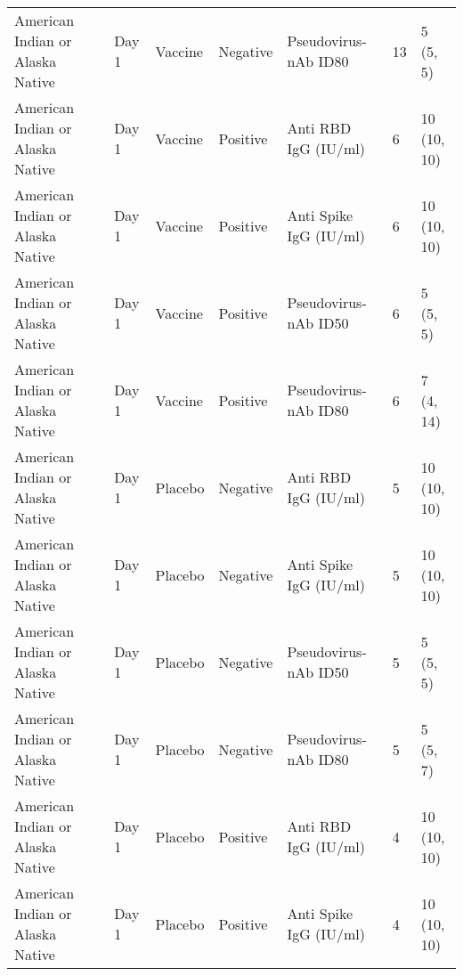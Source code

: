 \documentclass[]{book}
\theoremstyle{definition}
\theoremstyle{definition}
\theoremstyle{definition}
\newcommand{\1}{\mathbbm{1}}
\begin{document}
\begin{landscape}
\begin{ThreePartTable}
\begin{longtable}[t]{>{\raggedright\arraybackslash}p{7cm}llllll}
\hspace{1em}American Indian or Alaska Native & Day 1 & Vaccine & Negative & Pseudovirus-nAb ID80 & 13 & \makecell[l]{5\\(5, 5)}\\
\hspace{1em}American Indian or Alaska Native & Day 1 & Vaccine & Positive & Anti RBD IgG (IU/ml) & 6 & \makecell[l]{10\\(10, 10)}\\
\hspace{1em}American Indian or Alaska Native & Day 1 & Vaccine & Positive & Anti Spike IgG (IU/ml) & 6 & \makecell[l]{10\\(10, 10)}\\
\hspace{1em}American Indian or Alaska Native & Day 1 & Vaccine & Positive & Pseudovirus-nAb ID50 & 6 & \makecell[l]{5\\(5, 5)}\\
\hspace{1em}American Indian or Alaska Native & Day 1 & Vaccine & Positive & Pseudovirus-nAb ID80 & 6 & \makecell[l]{7\\(4, 14)}\\
\hspace{1em}American Indian or Alaska Native & Day 1 & Placebo & Negative & Anti RBD IgG (IU/ml) & 5 & \makecell[l]{10\\(10, 10)}\\
\hspace{1em}American Indian or Alaska Native & Day 1 & Placebo & Negative & Anti Spike IgG (IU/ml) & 5 & \makecell[l]{10\\(10, 10)}\\
\hspace{1em}American Indian or Alaska Native & Day 1 & Placebo & Negative & Pseudovirus-nAb ID50 & 5 & \makecell[l]{5\\(5, 5)}\\
\hspace{1em}American Indian or Alaska Native & Day 1 & Placebo & Negative & Pseudovirus-nAb ID80 & 5 & \makecell[l]{5\\(5, 7)}\\
\hspace{1em}American Indian or Alaska Native & Day 1 & Placebo & Positive & Anti RBD IgG (IU/ml) & 4 & \makecell[l]{10\\(10, 10)}\\
\hspace{1em}American Indian or Alaska Native & Day 1 & Placebo & Positive & Anti Spike IgG (IU/ml) & 4 & \makecell[l]{10\\(10, 10)}\\

\end{longtable}
\end{ThreePartTable}
\end{landscape}
\end{document}
